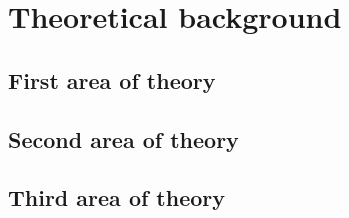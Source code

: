 %
%
%
\chapter{Theoretical background}
\label{ch:theory}

\section{First area of theory}
\label{sec:theory-1}
%
%
%

\section{Second area of theory}
\label{sec:theory-2}

\section{Third area of theory}
\label{sec:theory-3}

